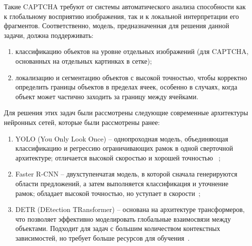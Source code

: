 Такие CAPTCHA требуют от системы автоматического анализа способности как к 
глобальному восприятию изображения, так и к локальной интерпретации его 
фрагментов. Соответственно, модель, предназначенная для решения данной задачи, 
должна поддерживать:
\begin{enumerate}
    \item классификацию объектов на уровне отдельных изображений (для CAPTCHA, 
    основанных на отдельных картинках в сетке);
    \item локализацию и сегментацию объектов с высокой точностью, чтобы 
    корректно определить границы объектов в пределах ячеек, особенно в случаях, 
    когда объект может частично заходить за границу между ячейками.
\end{enumerate}

Для решения этих задач были рассмотрены следующие современные архитектуры 
нейронных сетей, которые были рассмотрены ранее:
\begin{enumerate}
    \item YOLO (You Only Look Once) -- однопроходная модель, объединяющая 
    классификацию и регрессию ограничивающих рамок в одной сверточной 
    архитектуре; отличается высокой скоростью и хорошей точностью~
    \cite{redmon2016yolov2, UltralyticsYOLOv8};
    \item Faster R-CNN -- двухступенчатая модель, в которой сначала генерируются 
    области предложений, а затем выполняется классификация и уточнение рамок; 
    обладает высокой точностью, но уступает в скорости~\cite{ren2015fasterrcnn};
    \item DETR (DEtection TRansformer) -- основана на архитектуре трансформеров, 
    что позволяет эффективно моделировать глобальные взаимосвязи между объектами. 
    Подходит для задач с большим количеством контекстных зависимостей, но требует 
    больше ресурсов для обучения~\cite{carion2020detr}.
\end{enumerate}

